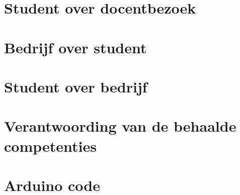 \documentclass{mimosis}
\begin{document}
\begin{appendices}
\appendixpage
\noappendicestocpagenum
\addappheadtotoc
% 
\chapter{Student over docentbezoek}

\chapter{Bedrijf over student}

\chapter{Student over bedrijf}

\chapter{Verantwoording van de behaalde competenties}

% 
\chapter{Arduino code}
\label{code} %

\end{appendices}

\backmatter
\end{document}
